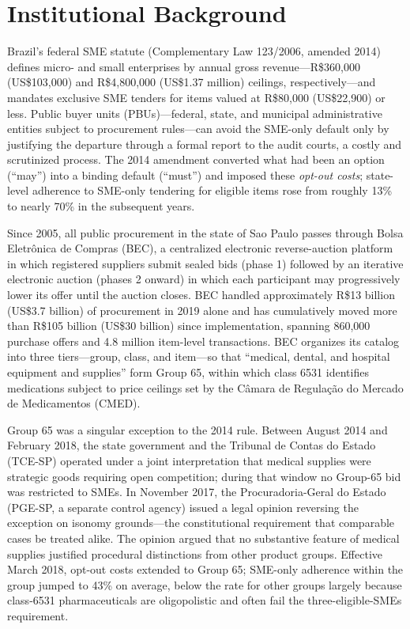 \section{Institutional Background}

Brazil's federal SME statute (Complementary Law 123/2006, amended 2014) defines micro- and small enterprises by annual gross revenue---R\$360{,}000 (US\$103{,}000) and R\$4{,}800{,}000 (US\$1.37 million) ceilings, respectively---and mandates exclusive SME tenders for items valued at R\$80{,}000 (US\$22{,}900) or less. Public buyer units (PBUs)---federal, state, and municipal administrative entities subject to procurement rules---can avoid the SME-only default only by justifying the departure through a formal report to the audit courts, a costly and scrutinized process. The 2014 amendment converted what had been an option (``may'') into a binding default (``must'') and imposed these \emph{opt-out costs}; state-level adherence to SME-only tendering for eligible items rose from roughly 13\% to nearly 70\% in the subsequent years.

Since 2005, all public procurement in the state of Sao Paulo passes through Bolsa Eletr\^onica de Compras (BEC), a centralized electronic reverse-auction platform in which registered suppliers submit sealed bids (phase 1) followed by an iterative electronic auction (phases 2 onward) in which each participant may progressively lower its offer until the auction closes. BEC handled approximately R\$13 billion (US\$3.7 billion) of procurement in 2019 alone and has cumulatively moved more than R\$105 billion (US\$30 billion) since implementation, spanning 860{,}000 purchase offers and 4.8 million item-level transactions. BEC organizes its catalog into three tiers---group, class, and item---so that ``medical, dental, and hospital equipment and supplies'' form Group 65, within which class 6531 identifies medications subject to price ceilings set by the C\^amara de Regula\c{c}\~ao do Mercado de Medicamentos (CMED).

Group 65 was a singular exception to the 2014 rule. Between August 2014 and February 2018, the state government and the Tribunal de Contas do Estado (TCE-SP) operated under a joint interpretation that medical supplies were strategic goods requiring open competition; during that window no Group-65 bid was restricted to SMEs. In November 2017, the Procuradoria-Geral do Estado (PGE-SP, a separate control agency) issued a legal opinion reversing the exception on isonomy grounds---the constitutional requirement that comparable cases be treated alike. The opinion argued that no substantive feature of medical supplies justified procedural distinctions from other product groups. Effective March 2018, opt-out costs extended to Group 65; SME-only adherence within the group jumped to 43\% on average, below the rate for other groups largely because class-6531 pharmaceuticals are oligopolistic and often fail the three-eligible-SMEs requirement.

